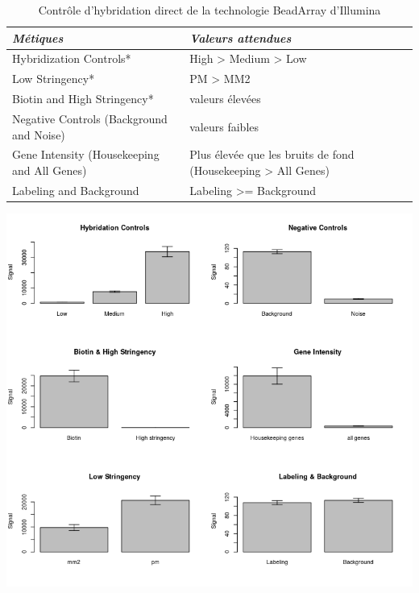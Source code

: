 \documentclass[a4paper,10pt]{article}
\begin{document}
\begin{table}[!ht]
\centering
\begin{tabular}{|p{3cm}|p{9cm}|}
\hline
 \emph{Métiques} & \emph{Valeurs attendues}\\
\hline
Hybridization Controls*   &  High > Medium > Low \\
\hline 
Low Stringency* & PM > MM2\\
\hline
Biotin and High Stringency* & valeurs élevées\\
\hline
Negative Controls (Background and Noise) & valeurs faibles \\
\hline
Gene Intensity (Housekeeping and All Genes) & Plus élevée que les bruits de fond (Housekeeping > All Genes) \\
\hline
Labeling and Background & Labeling >= Background \\
\hline
\end{tabular}
\caption{Contrôle d'hybridation direct de la technologie BeadArray d'Illumina}
\label{Control Dyrect  Hyb}
\end{table}
\begin{center}
 \includegraphics[scale=0.7]{../../R/output/SummaryControl.png}
\end{center}
\end{document}
